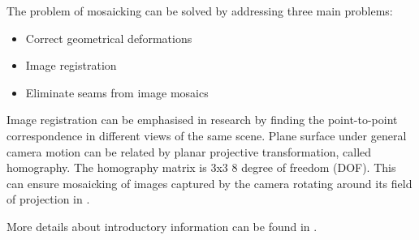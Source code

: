 
The problem of mosaicking can be solved by addressing three main problems:

\begin{itemize}
\item Correct geometrical deformations
\item Image registration
\item Eliminate seams from image mosaics
\end{itemize}

Image registration can be emphasised in research by finding the point-to-point correspondence in different views of the same scene. Plane surface under general camera motion can be related by planar projective transformation, called homography. The homography matrix is 3x3 8 degree of freedom (DOF). This can ensure mosaicking of images captured by the camera rotating around its field of projection in \cite{zheng1992panoramic}.

More details about introductory information can be found in \cite{mosaic_image_intro,capel2004image} .

 


